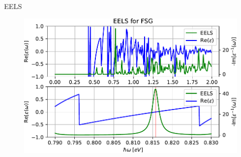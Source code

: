 \documentclass{beamer}
\begin{document}

\begin{frame}{EELS}
    \begin{figure}
        \centering
        \includegraphics[width=.8\textwidth]{img/eels_FSG_pres.pdf}
    \end{figure}
\end{frame}
\end{document}
